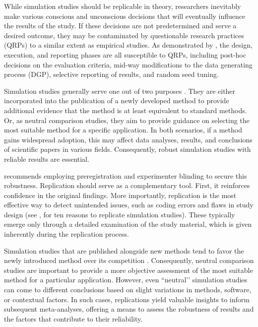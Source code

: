 \documentclass[12pt]{article}
\begin{document}
While simulation studies should be replicable in theory, researchers inevitably make various conscious and unconscious decisions that will eventually influence the results of the study. If these decisions are not predetermined and serve a desired outcome, they may be contaminated by questionable research practices (QRPs) to a similar extent as empirical studies. As demonstrated by \textcite{pawel:24}, the design, execution, and reporting phases are all susceptible to QRPs, including post-hoc decisions on the evaluation criteria, mid-way modifications to the data generating process (DGP), selective reporting of results, and random seed tuning.

Simulation studies generally serve one out of two purposes \parencite{boulesteix:13}. They are either incorporated into the publication of a newly developed method to provide additional evidence that the method is at least equivalent to standard methods. Or, as neutral comparison studies, they aim to provide guidance on selecting the most suitable method for a specific application. In both scenarios, if a method gains widespread adoption, this may affect data analyses, results, and conclusions of scientific papers in various fields. Consequently, robust simulation studies with reliable results are essential.

\textcite{strobl:23} recommends employing preregistration and experimenter blinding to secure this robustness. Replication should serve as a complementary tool. First, it reinforces confidence in the original findings. More importantly, replication is the most effective way to detect unintended issues, such as coding errors and flaws in study design (see \cite{lohmann2022s}, for ten reasons to replicate simulation studies). These typically emerge only through a detailed examination of the study material, which is given inherently during the replication process.

Simulation studies that are published alongside new methods tend to favor the newly introduced method over its competition \parencite{boulesteix:13}. Consequently, neutral comparison studies are important to provide a more objective assessment of the most suitable method for a particular application. However, even ``neutral’’ simulation studies can come to different conclusions based on slight variations in methods, software, or contextual factors. In such cases, replications yield valuable insights to inform subsequent meta-analyses, offering a means to assess the robustness of results and the factors that contribute to their reliability.
\end{document}
